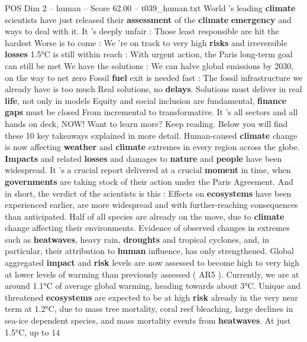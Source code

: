 \begin{textsample}{POS Dim 2 – human – Score 62.00 – t039\_human.txt}  \label{ex:f2_pos_023}
World ’s leading \textbf{climate} scientists have just released their \textbf{assessment} of the \textbf{climate} \textbf{emergency} and ways to deal with it.
It ’s deeply unfair : Those least responsible are hit the hardest Worse is to come : We ’re on track to very high \textbf{risks} and irreversible \textbf{losses} 1.5°C is still within reach : With urgent action, the Paris long-term goal can still be met We have the solutions : We can halve global emissions by 2030, on the way to net zero Fossil \textbf{fuel} exit is needed fast : The fossil infrastructure we already have is too much Real solutions, no \textbf{delays}.
Solutions must deliver in real \textbf{life}, not only in models Equity and social inclusion are fundamental, \textbf{finance} \textbf{gaps} must be closed From incremental to transformative.
It ’s all sectors and all hands on deck, NOW!
Want to learn more?
Keep reading.
Below you will find these 10 key takeaways explained in more detail.
Human-caused \textbf{climate} change is now affecting \textbf{weather} and \textbf{climate} extremes in every region across the globe. \textbf{Impacts} and related \textbf{losses} and damages to \textbf{nature} and \textbf{people} have been widespread.
It ’s a crucial report delivered at a crucial \textbf{moment} in time, when \textbf{governments} are taking stock of their action under the Paris Agreement.
And in short, the verdict of the scientists is this : Effects on \textbf{ecosystems} have been experienced earlier, are more widespread and with further-reaching consequences than anticipated.
Half of all species are already on the move, due to \textbf{climate} change affecting their environments.
Evidence of observed changes in extremes such as \textbf{heatwaves}, heavy rain, \textbf{droughts} and tropical cyclones, and, in particular, their attribution to \textbf{human} influence, has only strengthened.
Global aggregated \textbf{impact} and \textbf{risk} levels are now assessed to become high to very high at lower levels of warming than previously assessed ( AR5 ).
Currently, we are at around 1.1°C of average global warming, heading towards about 3°C.
Unique and threatened \textbf{ecosystems} are expected to be at high \textbf{risk} already in the very near term at 1.2°C, due to mass tree mortality, coral reef bleaching, large declines in sea-ice dependent species, and mass mortality events from \textbf{heatwaves}.
At just 1.5°C, up to 14 %

\end{textsample}
